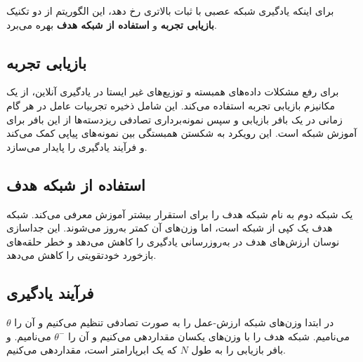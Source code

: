 برای اینکه یادگیری شبکه عصبی با ثبات بالاتری رخ دهد، این الگوریتم از دو تکنیک 
\textbf{بازیابی تجربه}
و
\textbf{استفاده از شبکه هدف}
بهره می‌برد.
\subsection{بازیابی تجربه}
برای رفع مشکلات داده‌های همبسته و توزیع‌های غیر ایستا در یادگیری آنلاین،  از یک مکانیزم بازیابی تجربه استفاده می‌کند. این شامل ذخیره تجربیات عامل در هر گام زمانی در یک بافر بازیابی و سپس نمونه‌برداری تصادفی ریزدسته‌ها 
 از این بافر برای آموزش شبکه است. این رویکرد به شکستن همبستگی بین نمونه‌های پیاپی کمک می‌کند و فرآیند یادگیری را پایدار می‌سازد.
\subsection{استفاده از شبکه هدف}
 یک شبکه دوم به نام شبکه هدف را برای استقرار بیشتر آموزش معرفی می‌کند. شبکه هدف یک کپی از شبکه  است، اما وزن‌های آن کمتر به‌روز می‌شوند. این جداسازی نوسان ارزش‌های هدف در به‌روزرسانی یادگیری  را کاهش می‌دهد و خطر حلقه‌های بازخورد خودتقویتی را کاهش می‌دهد.
\subsection{فرآیند یادگیری}
در ابتدا وزن‌های شبکه ارزش-عمل را به صورت تصادفی تنظیم می‌کنیم و آن را $\theta$ می‌نامیم.
 شبکه هدف را با وزن‌های یکسان مقداردهی می‌کنیم و آن را $\theta^-$ می‌نامیم.
و بافر بازیابی را
به طول $N$ که یک ابرپارامتر است، مقداردهی می‌کنیم.

